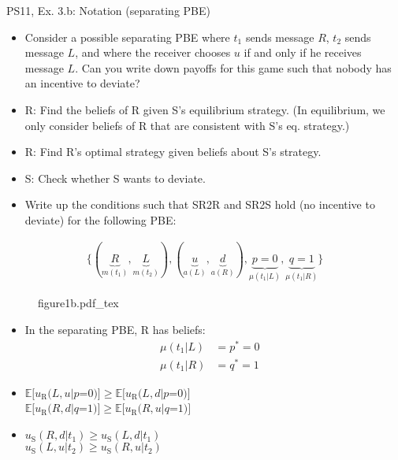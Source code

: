 \begin{frame}{PS11, Ex. 3.b: Notation (separating PBE)}
    \begin{itemize}
        \item[(b)] Consider a possible separating PBE where $t_1$ sends message $R$, $t_2$ sends message $L$, and where the receiver chooses $u$ if and only if he receives message $L$. Can you write down payoffs for this game such that nobody has an incentive to deviate?
    \end{itemize} \vspace{-8pt}
    \begin{multicols}{2}
      \begin{itemize}
        \item[SR3:] R: Find the beliefs of R given S's equilibrium strategy. (In equilibrium, we only consider beliefs of R that are consistent with S's eq. strategy.)
        \item[SR2R:] R: Find R's optimal strategy given beliefs about S's strategy.
        \item[SR2S:] S: Check whether S wants to deviate.
        \item[PBE:]  Write up the conditions such that SR2R and SR2S hold (no incentive to deviate) for the following PBE:
      \end{itemize}\vspace{-14pt}
      \begin{align*}
        \{(\underbrace{R}_{m(t_1)},\underbrace{L}_{m(t_2)}),(\underbrace{u}_{a(L)},\underbrace{d}_{a(R)}),\underbrace{p=0}_{\mu(t_1|L)},\underbrace{q=1}_{\mu(t_1|R)}\}
      \end{align*}
      \vfill\null\columnbreak
      \begin{figure}[!h]
        \center
        \def\svgwidth{\columnwidth}
        {figure1b.pdf_tex}
      \end{figure} \vspace{-8pt}
      \begin{itemize}
        \item[SR3:] In the separating PBE, R has beliefs:\vspace{-10pt}
        \begin{align*}
          \mu(t_1|L)&=p^*=0&\\
          \mu(t_1|R)&=q^*=1
        \end{align*}
        \item[SR2R:] \vspace{-6pt}
                     $\mathbb{E}[u_\text{R}(L,u|p$=$0)]\geq\mathbb{E}[u_\text{R}(L,d|p$=$0)]$\\
                     $\mathbb{E}[u_\text{R}(R,d|q$=$1)]\geq \mathbb{E}[u_\text{R}(R,u|q$=$1)]$
        \item[SR2S:] $u_\text{S}(R,d|t_1)\geq u_\text{S}(L,d|t_1)$\\
                     $u_\text{S}(L,u|t_2)\geq u_\text{S}(R,u|t_2)$
      \end{itemize}
      \vfill\null \columnbreak
      \vfill
    \end{multicols}
\end{frame}



